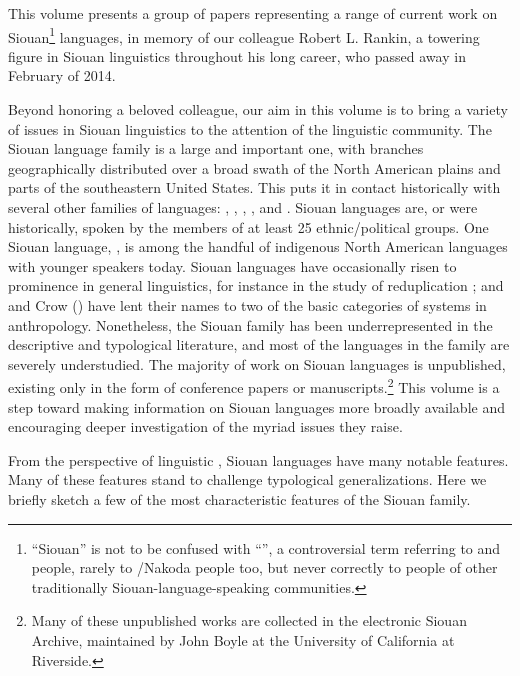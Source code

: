 \begin{refsection}

This volume presents a group of papers representing a range of current work on Siouan\footnote{``Siouan'' is not to be confused with ``'', a controversial term referring to  and  people, rarely to /Nakoda people too, but never correctly to people of other traditionally Siouan-language-speaking communities.} languages, in memory of our colleague Robert L. Rankin, a towering figure in Siouan linguistics throughout his long career, who passed away in February of 2014.


Beyond honoring a beloved colleague, our aim in this volume is to bring a variety of issues in Siouan linguistics to the attention of the linguistic community. The Siouan language family is a large and important one, with branches geographically distributed over a broad swath of the North American plains and parts of the southeastern United States. This puts it in contact historically with several other families of languages: , , , , and . Siouan languages are, or were historically, spoken by the members of at least 25 ethnic/political groups. One Siouan language, , is among the handful of indigenous North American languages with younger speakers today. Siouan languages have occasionally risen to prominence in general linguistics, for instance in the study of reduplication \citep{Shaw1980}; and  and Crow () have lent their names to two of the basic categories of  systems in anthropology. Nonetheless, the Siouan family has been underrepresented in the descriptive and typological literature, and most of the languages in the family are severely understudied. The majority of work on Siouan languages is unpublished, existing only in the form of conference papers or manuscripts.\footnote{Many of these unpublished works are collected in the electronic Siouan Archive, maintained by John Boyle at the University of California at Riverside.} This volume is a step toward making information on Siouan languages more broadly available and encouraging deeper investigation of the myriad issues they raise.


From the perspective of linguistic , Siouan languages have many notable features. Many of these features stand to challenge typological generalizations. Here we briefly sketch a few of the most characteristic features of the Siouan family.



\end{refsection}
